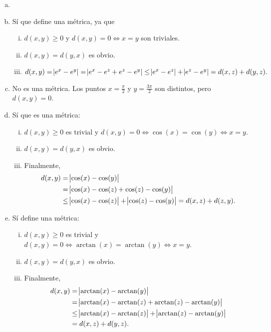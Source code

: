 \begin{eje}
    \begin{enumerate}[(a)]
        \item[]
        \item Sí que define una m\'etrica, ya que
            \begin{enumerate}[i)]
                \item $d(x,y) \geq 0$ y $d(x,y) = 0 \iff x = y$ son triviales.
                \item $d(x,y) = d(y,x)$ es obvio.
                \item $d(x,y) = \abs{e^x - e^y} = \abs{e^x - e^z + e^z - e^y} \leq \abs{e^x - e^z} + \abs{e^z - e^y} = d(x,z) + d(y,z).$
            \end{enumerate}
        \item No es una m\'etrica. Los puntos $x = \frac{\pi}{2}$ y $y = \frac{3\pi}{2}$ son distintos, pero $d(x, y) = 0$.
        \item Sí que es una m\'etrica:
            \begin{enumerate}[i)]
                \item $d(x, y) \geq 0$ es trivial y $d(x,y) = 0 \iff \cos(x) = \cos(y) \iff x = y$.
                \item $d(x, y) = d(y,x)$ es obvio.
                \item Finalmente,
                    \begin{align*}
                        d(x, y) &= \abs{\cos(x) - \cos(y)} \\
                        &= \abs{\cos(x) - \cos(z) + \cos(z) - \cos(y)} \\
                        &\leq \abs{\cos(x) - \cos(z)} + \abs{\cos(z) - \cos(y)} = d(x,z) + d(z,y).
                    \end{align*}
            \end{enumerate}
        \item Sí define una m\'etrica:
            \begin{enumerate}[i)]
                \item $d(x, y) \geq 0$ es trivial y $d(x, y) = 0 \iff \arctan(x) = \arctan(y) \iff x = y$.
                \item $d(x, y) = d(y, x)$ es obvio.
                \item Finalmente,
                    \begin{align*}
                        d(x, y) &= \abs{\arctan(x) - \arctan(y)} \\
                        &= \abs{\arctan(x) - \arctan(z) + \arctan(z) - \arctan(y)} \\
                        &\leq \abs{\arctan(x) - \arctan(z)} + \abs{\arctan(z) - \arctan(y)} \\
                        &= d(x, z) + d(y,z).
                    \end{align*}
            \end{enumerate}
    \end{enumerate}


\end{eje}
